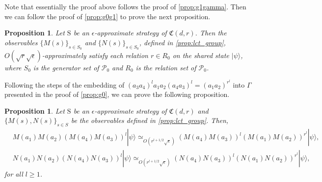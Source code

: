 \documentclass[11pt,letterpaper]{article}
\newcommand{\ket}[1]{|#1\rangle}
\newcommand{\1}{\mathbb{1}}
\newcommand{\Pg}{\mathcal{P}}
\newcommand{\fC}{\mathfrak{C}}
\newcommand{\bS}{\mathrm{S}}
\newcommand{\ep}{\epsilon}
\newcommand{\se}{\sqrt{\epsilon}}
\newcommand{\sr}{\sqrt{r}}
\newcommand{\appd}[1]{\simeq_{#1}}
\newtheorem{proposition}[theorem]{Proposition}
\theoremstyle{definition}
\begin{document}
Note that essentially the proof above follows the proof of 
\cref{prop:g1gamma}. Then we can follow the proof of \cref{prop:g0g1}
to prove the next proposition.
\begin{proposition}
    \label{prop:lct_pg0}
    Let $\bS$ be an $\ep$-approximate strategy of $\fC(d,r)$.
	Then the observables $\{ M(s) \}_{s \in S_0}$ and 
	$\{N(s)\}_{s \in S_0}$, defined in 
\cref{prop:lct_group}, $O(\sr \se)$-approximately satisfy
	each relation $r \in R_0$ on the shared state $\ket{\psi}$, 
	where $S_0$ is the generator set of $\Pg_0$
    and $R_0$ is the relation set of $\Pg_0$.	
\end{proposition}
Following the steps of the embedding of $(a_3a_4)^l a_1a_2(a_4a_3)^l = (a_1a_2)^{r^l}$ into $\Gamma$ presented in
the proof of \cref{prop:g0},
we can prove the following proposition.
\begin{proposition}
\label{prop:lct_adv}
Let $\bS$ be an $\ep$-approximate strategy of $\fC(d,r)$ and $\{M(s), N(s)\}_{s \in S}$ be the observables defined in 
\cref{prop:lct_group}. 
Then,
\begin{align}
	&M(a_1)M(a_2) (M(a_4)M(a_3))^l \ket{\psi}\appd{O(r^{l+1/2} \se)} (M(a_4)M(a_3))^l (M(a_1)M(a_2))^{r^l} \ket{\psi}, \\
	&N(a_1)N(a_2) (N(a_4)N(a_3))^l \ket{\psi}\appd{O(r^{l+1/2} \se)} (N(a_4)N(a_3))^l (N(a_1)N(a_2))^{r^l} \ket{\psi}, 
\end{align}
for all $l \geq 1$.
\end{proposition}
\end{document}
